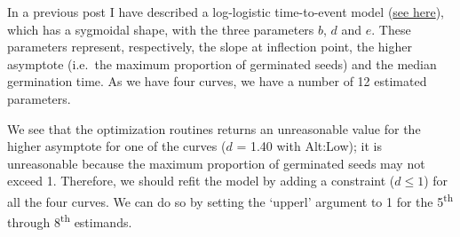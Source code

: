 \documentclass[
]{book}
\begin{document}
In a previous post I have described a log-logistic time-to-event model (\href{https://www.statforbiology.com/2021/stat_drcte_4-time-to-eventcurves/}{see here}), which has a sygmoidal shape, with the three parameters \(b\), \(d\) and \(e\). These parameters represent, respectively, the slope at inflection point, the higher asymptote (i.e.~the maximum proportion of germinated seeds) and the median germination time. As we have four curves, we have a number of 12 estimated parameters.

We see that the optimization routines returns an unreasonable value for the higher asymptote for one of the curves (\(d\) = 1.40 with Alt:Low); it is unreasonable because the maximum proportion of germinated seeds may not exceed 1. Therefore, we should refit the model by adding a constraint (\(d \le 1\)) for all the four curves. We can do so by setting the `upperl' argument to 1 for the 5\textsuperscript{th} through 8\textsuperscript{th} estimands.
\end{document}
